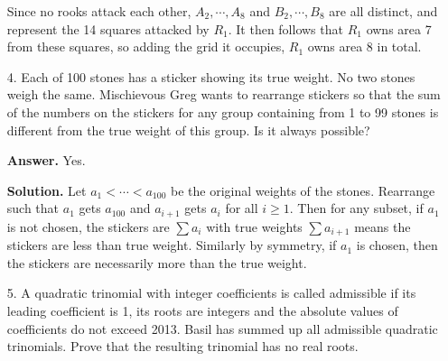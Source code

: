 \documentclass[11pt,a4paper]{article}
\begin{document}
\begin{enumerate}
    Since no rooks attack each other, $A_2, \cdots, A_8$ and $B_2, \cdots, B_8$ 
    are all distinct, and represent the 14 squares attacked by $R_1$. 
    It then follows that $R_1$ owns area 7 from these squares, so adding the grid it occupies, $R_1$ owns area 8 in total. 
    
    \item [4.] 
    Each of 100 stones has a sticker showing its true weight. No two stones weigh the
    same. Mischievous Greg wants to rearrange stickers so that the sum of the numbers on the
    stickers for any group containing from 1 to 99 stones is different from the true weight of this
    group. Is it always possible?
    
    \textbf{Answer.} Yes. 
    
    \textbf{Solution.} 
    Let $a_1<\cdots < a_{100}$ be the original weights of the stones. 
    Rearrange such that $a_1$ gets $a_{100}$ and $a_{i+1}$ gets $a_i$ for all $i\ge 1$. 
    Then for any subset, if $a_1$ is not chosen, 
    the stickers are $\sum a_i$ with true weights $\sum a_{i+1}$ means the stickers are less than true weight. 
    Similarly by symmetry, if $a_1$ is chosen, 
    then the stickers are necessarily more than the true weight. 
    
    \item[5.] 
    A quadratic trinomial with integer coefficients is called admissible if its leading coefficient is 1, its roots are integers and the absolute values of coefficients do not exceed 2013.
    Basil has summed up all admissible quadratic trinomials. Prove that the resulting trinomial
    has no real roots. 
    
\end{enumerate}
\end{document}
